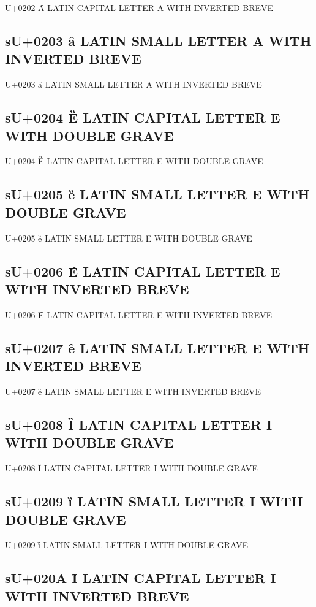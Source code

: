 U+0202 Ȃ LATIN CAPITAL LETTER A WITH INVERTED BREVE

\subsection{sU+0203 ȃ LATIN SMALL LETTER A WITH INVERTED BREVE}

U+0203 ȃ LATIN SMALL LETTER A WITH INVERTED BREVE

\subsection{sU+0204 Ȅ LATIN CAPITAL LETTER E WITH DOUBLE GRAVE}

U+0204 Ȅ LATIN CAPITAL LETTER E WITH DOUBLE GRAVE

\subsection{sU+0205 ȅ LATIN SMALL LETTER E WITH DOUBLE GRAVE}

U+0205 ȅ LATIN SMALL LETTER E WITH DOUBLE GRAVE

\subsection{sU+0206 Ȇ LATIN CAPITAL LETTER E WITH INVERTED BREVE}

U+0206 Ȇ LATIN CAPITAL LETTER E WITH INVERTED BREVE

\subsection{sU+0207 ȇ LATIN SMALL LETTER E WITH INVERTED BREVE}

U+0207 ȇ LATIN SMALL LETTER E WITH INVERTED BREVE

\subsection{sU+0208 Ȉ LATIN CAPITAL LETTER I WITH DOUBLE GRAVE}

U+0208 Ȉ LATIN CAPITAL LETTER I WITH DOUBLE GRAVE

\subsection{sU+0209 ȉ LATIN SMALL LETTER I WITH DOUBLE GRAVE}

U+0209 ȉ LATIN SMALL LETTER I WITH DOUBLE GRAVE

\subsection{sU+020A Ȋ LATIN CAPITAL LETTER I WITH INVERTED BREVE}

